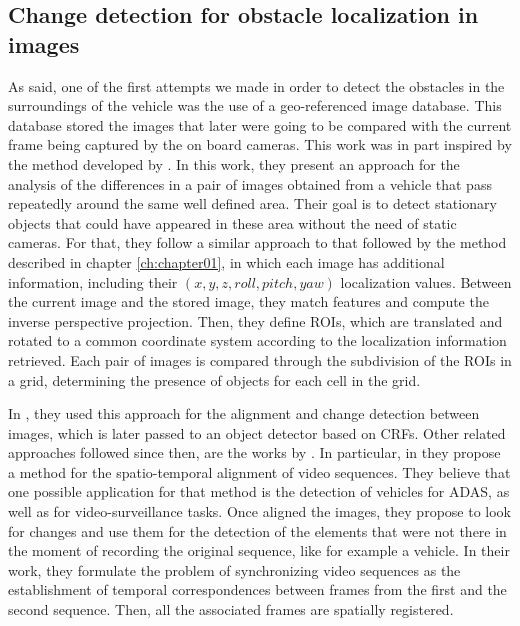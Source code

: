 \subsection{Change detection for obstacle localization in images}\label{ch:chapter00_02_01}

As said, one of the first attempts we made in order to detect the obstacles in the surroundings of the vehicle was the use of a geo-referenced image database. This database stored the images that later were going to be compared with the current frame being captured by the on board cameras. This work was in part inspired by the method developed by \cite{primdahl2005change}. In this work, they present an approach for the analysis of the differences in a pair of images obtained from a vehicle that pass repeatedly around the same well defined area. Their goal is to detect stationary objects that could have appeared in these area without the need of static cameras. For that, they follow a similar approach to that followed by the method described in chapter \ref{ch:chapter01}, in which each image has additional information, including their $(x, y, z, roll, pitch, yaw)$ localization values. Between the current image and the stored image, they match features and compute the inverse perspective projection. Then, they define \acp{ROI}, which are translated and rotated to a common coordinate system according to the localization information retrieved. Each pair of images is compared through the subdivision of the \acp{ROI} in a grid, determining the presence of objects for each cell in the grid.

In \cite{vallespi2012prior}, they used this approach for the alignment and change detection between images, which is later passed to an object detector based on \acp{CRF}. Other related approaches followed since then, are the works by \cite{diego2011video, evangelidis2011slice, evangelidis2011efficient}. In particular, in \cite{diego2011video} they propose a method for the spatio-temporal alignment of video sequences. They believe that one possible application for that method is the detection of vehicles for \ac{ADAS}, as well as for video-surveillance tasks. Once aligned the images, they propose to look for changes and use them for the detection of the elements that were not there in the moment of recording the original sequence, like for example a vehicle. In their work, they formulate the problem of synchronizing video sequences as the establishment of temporal correspondences between frames from the first and the second sequence. Then, all the associated frames are spatially registered.

